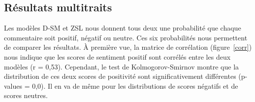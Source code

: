 \documentclass[a4paper,12pt, openany]{book}
\begin{document}
\subsection{Résultats multitraits}



Les modèles D-SM et ZSL nous donnent tous deux une probabilité que chaque commentaire soit positif, négatif ou neutre. Ces six probabilités nous permettent de comparer les résultats. À première vue, la matrice de corrélation (figure~\ref{corr}) nous indique que les scores de sentiment positif sont corrélés entre les deux modèles (r = 0,53).  Cependant, le test de Kolmogorov-Smirnov montre que la distribution de ces deux scores de positivité sont significativement différentes (p-values = 0,0). Il en va de même pour les distributions de scores négatifs et de scores neutres. \par
\end{document}

